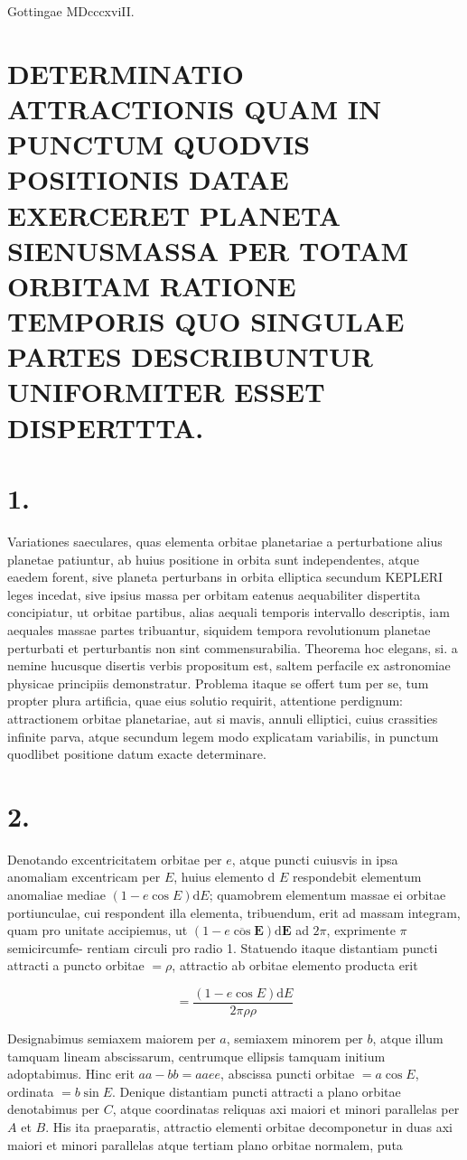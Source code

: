 \documentclass[10pt]{article}
\begin{document}
Gottingae MDcccxviII.

\section*{DETERMINATIO ATTRACTIONIS QUAM IN PUNCTUM QUODVIS POSITIONIS DATAE EXERCERET PLANETA SIENUSMASSA PER TOTAM ORBITAM RATIONE TEMPORIS QUO SINGULAE PARTES DESCRIBUNTUR UNIFORMITER ESSET DISPERTTTA.}
\section*{1.}
Variationes saeculares, quas elementa orbitae planetariae a perturbatione alius planetae patiuntur, ab huius positione in orbita sunt independentes, atque eaedem forent, sive planeta perturbans in orbita elliptica secundum KEPLERI leges incedat, sive ipsius massa per orbitam eatenus aequabiliter dispertita concipiatur, ut orbitae partibus, alias aequali temporis intervallo descriptis, iam aequales massae partes tribuantur, siquidem tempora revolutionum planetae perturbati et perturbantis non sint commensurabilia. Theorema hoc elegans, si. a nemine hucusque disertis verbis propositum est, saltem perfacile ex astronomiae physicae principiis demonstratur. Problema itaque se offert tum per se, tum propter plura artificia, quae eius solutio requirit, attentione perdignum: attractionem orbitae planetariae, aut si mavis, annuli elliptici, cuius crassities infinite parva, atque secundum legem modo explicatam variabilis, in punctum quodlibet positione datum exacte determinare.

\section*{2.}
Denotando excentricitatem orbitae per \(e\), atque puncti cuiusvis in ipsa anomaliam excentricam per \(E\), huius elemento d \(E\) respondebit elementum anomaliae mediae \((1-e \cos E) \mathrm{d} E\); quamobrem elementum massae ei orbitae portiunculae, cui respondent illa elementa, tribuendum, erit ad massam integram, quam pro unitate accipiemus, ut \((1-e \overline{\cos } \boldsymbol{E}) \mathrm{d} \boldsymbol{E}\) ad \(2 \pi\), exprimente \(\pi\) semicircumfe-
rentiam circuli pro radio 1. Statuendo itaque distantiam puncti attracti a puncto orbitae \(=\rho\), attractio ab orbitae elemento producta erit

\[
=\frac{(1-e \cos E) \mathrm{d} E}{2 \pi \rho \rho}
\]

Designabimus semiaxem maiorem per \(a\), semiaxem minorem per \(b\), atque illum tamquam lineam abscissarum, centrumque ellipsis tamquam initium adoptabimus. Hinc erit \(a a-b b=a a e e\), abscissa puncti orbitae \(=a \cos E\), ordinata \(=b \sin E\). Denique distantiam puncti attracti a plano orbitae denotabimus per \(C\), atque coordinatas reliquas axi maiori et minori parallelas per \(A\) et \(B\). His ita praeparatis, attractio elementi orbitae decomponetur in duas axi maiori et minori parallelas atque tertiam plano orbitae normalem, puta
\end{document}
